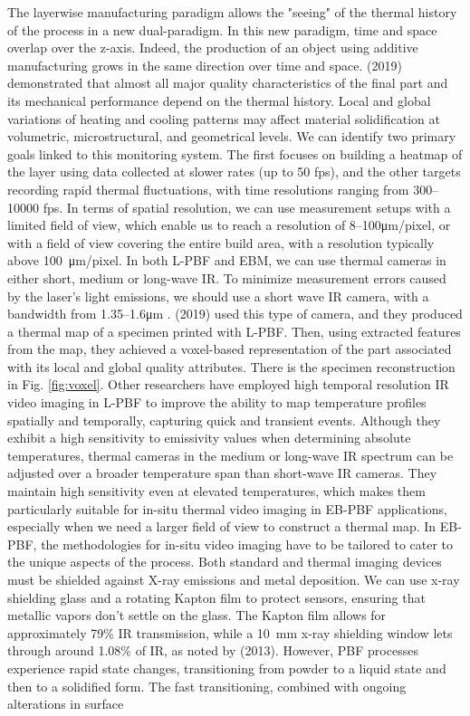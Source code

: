 The layerwise manufacturing paradigm allows the "seeing" of the thermal history of the process in a new dual-paradigm. In this new paradigm, time and space overlap over the z-axis. Indeed, the production of an object using additive manufacturing grows in the same direction over time and space. \citeauthor{williams_situ_2019} (2019) demonstrated that almost all major quality characteristics of the final part and its mechanical performance depend on the thermal history. Local and global variations of heating and cooling patterns may affect material solidification at volumetric, microstructural, and geometrical levels. We can identify two primary goals linked to this monitoring system. The first focuses on building a heatmap of the layer using data collected at slower rates (up to 50 fps), and the other targets recording rapid thermal fluctuations, with time resolutions ranging from \numrange{300}{10000} \unit{fps}. In terms of spatial resolution, we can use measurement setups with a limited field of view, which enable us to reach a resolution of \numrange[range-phrase=--]{8}{100}\unit{\micro\metre / pixel}, or with a field of view covering the entire build area, with a resolution typically above \SI{100}{\micro\metre / pixel}. In both L-PBF and EBM, we can use thermal cameras in either short, medium or long-wave IR. To minimize measurement errors caused by the laser's light emissions, we should use a short wave IR camera, with a bandwidth from \numrange{1.35}{1.6}\unit{\micro\metre} \cite{heigel_situ_2020}. \citeauthor{lough_-situ_2019} (2019) used this type of camera, and they produced a thermal map of a specimen printed with L-PBF. Then, using extracted features from the map, they achieved a voxel-based representation of the part associated with its local and global quality attributes. There is the specimen reconstruction in Fig. \ref{fig:voxel}. Other researchers have employed high temporal resolution IR video imaging in L-PBF to improve the ability to map temperature profiles spatially and temporally, capturing quick and transient events. Although they exhibit a high sensitivity to emissivity values when determining absolute temperatures, thermal cameras in the medium or long-wave IR spectrum can be adjusted over a broader temperature span than short-wave IR cameras. They maintain high sensitivity even at elevated temperatures, which makes them particularly suitable for in-situ thermal video imaging in EB-PBF applications, especially when we need a larger field of view to construct a thermal map. In EB-PBF, the methodologies for in-situ video imaging have to be tailored to cater to the unique aspects of the process. Both standard and thermal imaging devices must be shielded against X-ray emissions and metal deposition. We can use x-ray shielding glass and a rotating Kapton film to protect sensors, ensuring that metallic vapors don't settle on the glass. The Kapton film allows for approximately 79\% IR transmission, while a \SI{10}{\milli\metre} x-ray shielding window lets through around 1.08\% of IR, as noted by \citeauthor{ralph_b_dinwiddie_thermographic_2013} (2013). However, PBF processes experience rapid state changes, transitioning from powder to a liquid state and then to a solidified form. The fast transitioning, combined with ongoing alterations in surface 